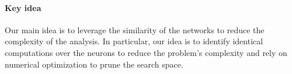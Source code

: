 



\paragraph{Key idea}
Our main idea is to leverage the similarity of the networks to reduce the complexity of the analysis. In particular, our idea is to identify identical computations over the neurons to reduce the problem's complexity and rely on numerical optimization to prune the search space. %

